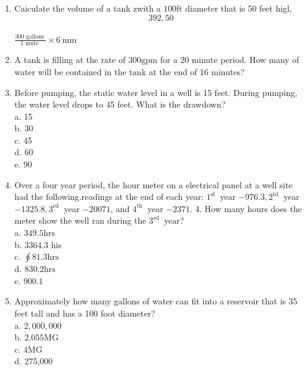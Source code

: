 \documentclass{article}
\begin{document}
\begin{enumerate}
\item Caiculate the volume of a tank zwith a $100 \mathrm{ft}$ diameter that is 50 feet higl,\\
$$392,50$$\\
$\frac{300 \text { gallons }}{1 \text { mute }} \times 6 \mathrm{~mm}$\\

\item A tank is filling at the rate of $300 \mathrm{gpm}$ for a 20 minute period. How many of water will be contained in the tank at the end of 16 minutes?\\

\item Before pumping, the static water level in a well is 15 feet. During pumping, the water level drops to 45 feet. What is the drawdown?\\
a. 15\\
b. 30\\
c. 45\\
d. 60\\
e. 90\\

\item Over a four year period, the hour meter on a electrical panel at a well site had the following.readings at the end of each year: $1^{\text {sl }}$ year $-976.3,2^{\text {td }}$ year $-1325.8,3^{\text {rd }}$ year $-20071$, and $4^{\text {th }}$ year $-2371$. 4. How many hours does the meter show the well ran during the $3^{\text {rd }}$ year?\\
a. $349.5 \mathrm{hrs}$\\
b. $3364.3$ his\\
c. $\oint 81.3 \mathrm{hrs}$\\
d. $830.2 \mathrm{hrs}$\\
e. $900.1$\\


\item Approximately how many gallons of water can fit into a reservoir that is 35 feet tall and has a 100 foot diameter?\\
a. $2,000,000$\\
b. $2.055 \mathrm{MG}$\\
c. $4 \mathrm{MG}$\\
d. 275,000\\



\end{enumerate}
\end{document}
